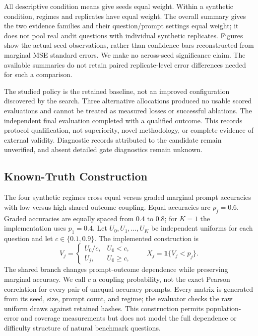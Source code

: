 \documentclass{article}
\begin{document}
All descriptive condition means give seeds equal weight. Within a synthetic condition, regimes and replicates have equal weight. The overall summary gives the two evidence families and their question/prompt settings equal weight; it does not pool real audit questions with individual synthetic replicates. Figures show the actual seed observations, rather than confidence bars reconstructed from marginal MSE standard errors. We make no across-seed significance claim. The available summaries do not retain paired replicate-level error differences needed for such a comparison.

The studied policy is the retained baseline, not an improved configuration discovered by the search. Three alternative allocations produced no usable scored evaluations and cannot be treated as measured losses or successful ablations. The independent final evaluation completed with a qualified outcome. This records protocol qualification, not superiority, novel methodology, or complete evidence of external validity. Diagnostic records attributed to the candidate remain unverified, and absent detailed gate diagnostics remain unknown.

\subsection{Known-Truth Construction}
The four synthetic regimes cross equal versus graded marginal prompt accuracies with low versus high shared-outcome coupling. Equal accuracies are $p_j=0.6$. Graded accuracies are equally spaced from $0.4$ to $0.8$; for $K=1$ the implementation uses $p_1=0.4$. Let $U_0,U_1,\ldots,U_K$ be independent uniforms for each question and let $c\in\{0.1,0.9\}$. The implemented construction is
\begin{equation}
 V_j=\begin{cases}U_0/c,&U_0<c,\\ U_j,&U_0\geq c,\end{cases}
 \qquad X_j=\mathbf{1}\{V_j<p_j\}.
 \label{eq:synthetic}
\end{equation}
The shared branch changes prompt-outcome dependence while preserving marginal accuracy. We call $c$ a coupling probability, not the exact Pearson correlation for every pair of unequal-accuracy prompts. Every matrix is generated from its seed, size, prompt count, and regime; the evaluator checks the raw uniform draws against retained hashes. This construction permits population-error and coverage measurements but does not model the full dependence or difficulty structure of natural benchmark questions.
\end{document}
